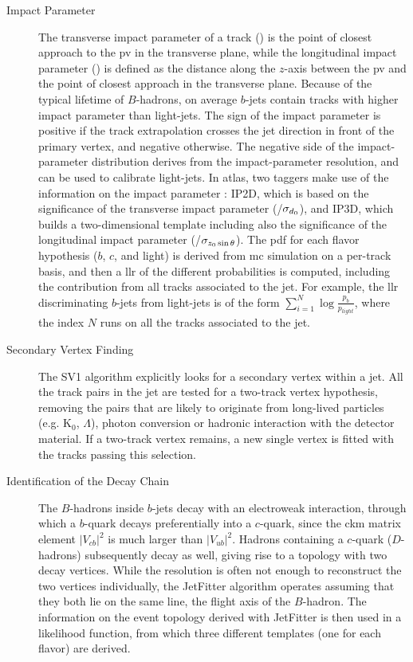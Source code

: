 \begin{description}

\item[Impact Parameter] The transverse impact parameter of a track (\dzero) is the point of closest approach to the 
\gls{pv} in the transverse plane, while the longitudinal impact parameter (\zzerost) is defined as the distance along 
the $z$-axis between the \gls{pv} and the point of closest approach in the transverse plane. Because of the typical 
lifetime of $B$-hadrons, on average $b$-jets contain tracks with higher impact parameter than light-jets. 
The sign of the impact parameter is positive if the track extrapolation crosses the jet direction in front of the primary vertex, and negative otherwise. 
The negative side of the impact-parameter distribution derives from the 
impact-parameter resolution, and can be used to calibrate light-jets. In \gls{atlas}, two taggers make use of the information on the impact parameter
 \cite{ATLAS:2011qia}: IP2D, which is based on the significance of the transverse impact parameter (\dzero/$\sigma_{{d_0}}$), and IP3D, which builds a two-dimensional template including also the significance of the longitudinal impact parameter (\zzerost/$\sigma_{{z_0} \sin\theta}$). The \gls{pdf} for each flavor hypothesis ($b$, $c$, and light) is derived from \gls{mc} simulation on a per-track basis, and then a \gls{llr} of the different probabilities is computed, including the contribution from all tracks associated to the jet. For example, the \gls{llr} discriminating $b$-jets from light-jets is of the form $\sum_{i=1}^{N}\log\frac{p_b}{p_{light}}$, where the index $N$ runs on all the tracks associated to the jet. 

\item[Secondary Vertex Finding] The SV1 algorithm \cite{ATLAS:2011qia} explicitly looks for a secondary vertex within a jet. 
All the track pairs in the jet are tested for a two-track vertex hypothesis, removing the pairs that are likely to originate from 
long-lived particles (e.g. K$_0$, $\Lambda$), photon conversion or hadronic interaction with the detector material. 
If a two-track vertex remains, a new single vertex is fitted with the tracks passing this selection.

\item[Identification of the Decay Chain] The $B$-hadrons inside $b$-jets decay with an electroweak interaction, 
through which a $b$-quark decays preferentially into a $c$-quark, since the \gls{ckm} matrix element $|V_{cb}|^2$ is much larger than $|V_{ub}|^2$. Hadrons containing a $c$-quark ($D$-hadrons) subsequently decay as well, giving rise to a topology with two decay vertices. While the resolution is often not enough to reconstruct the two vertices individually, the JetFitter algorithm \cite{1742-6596-119-3-032032} operates assuming that they both lie on the same line, the flight axis of the $B$-hadron. The information on the event topology derived with JetFitter is then used in a likelihood function, from which three different templates (one for each flavor) are derived.

\end{description}

